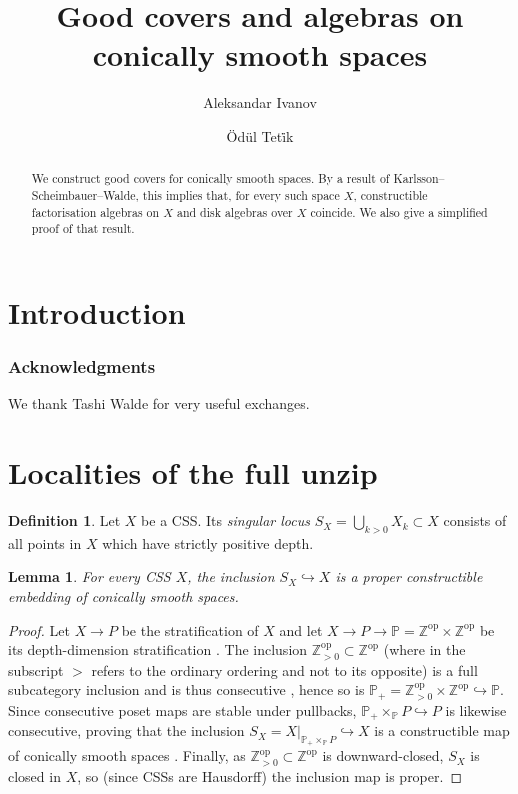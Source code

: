 \documentclass[11pt]{amsart}
\title{{Good covers and algebras on conically smooth spaces}}
\author{Aleksandar Ivanov}
\author{\"Od\"ul Tet\.{i}k}
\date{}
\newcommand{\mbb}[1]{\mathbb{#1}}
\newcommand{\opp}{{\mathrm{op}}}
\numberwithin{equation}{section}
\theoremstyle{definition}
\newtheorem{definition}[equation]{Definition}%
\theoremstyle{remark}
\theoremstyle{plain}
\newtheorem{lemma}[equation]{Lemma}
\begin{document}
\maketitle

\begin{abstract}
    We construct good covers for conically smooth spaces. By a result of Karlsson--Scheimbauer--Walde, this implies that, for every such space $X$, constructible factorisation algebras on $X$ and disk algebras over $X$ coincide. We also give a simplified proof of that result.
\end{abstract}



\tableofcontents

\section{Introduction}

\subsubsection*{Acknowledgments} We thank Tashi Walde for very useful exchanges.

\section{Localities of the full unzip}


\begin{definition}
    Let $X$ be a CSS. Its \emph{singular locus} $S_X=\bigcup_{k>0} X_k\subset X$ consists of all points in $X$ which have strictly positive depth.
\end{definition}

\begin{lemma}
    For every CSS $X$, the inclusion $S_X\hookrightarrow X$ is a proper constructible embedding of conically smooth spaces.
\end{lemma}
\begin{proof}
    Let $X\to P$ be the stratification of $X$ and let $X\to P\to\mbb{P}=\mbb{Z}^{\opp}\times\mbb{Z}^{\opp}$ be its depth-dimension stratification \cite[Lemma 2.4.10]{ayala2017local}. The inclusion $\mbb{Z}_{>0}^{\opp}\subset\mbb{Z}^\opp$ (where in the subscript $>$ refers to the ordinary ordering and not to its opposite) is a full subcategory inclusion and is thus consecutive \cite[Definition 2.3.1]{ayala2017local}, hence so is $\mbb{P}_{+}=\mbb{Z}_{>0}^\opp\times\mbb{Z}^\opp\hookrightarrow\mbb{P}$. Since consecutive poset maps are stable under pullbacks, $\mbb{P}_{+}\times_{\mbb{P}}P\hookrightarrow P$ is likewise consecutive, proving that the inclusion $S_X=X|_{\mbb{P}_+\times_{\mbb{P}}P}\hookrightarrow X$ is a constructible map of conically smooth spaces \cite[Lemma 3.4.5, Example 3.4.7]{ayala2017local}. Finally, as $\mbb{Z}_{>0}^{\opp}\subset\mbb{Z}^\opp$ is downward-closed, $S_X$ is closed in $X$, so (since CSSs are Hausdorff) the inclusion map is proper.
\end{proof}
\end{document}
